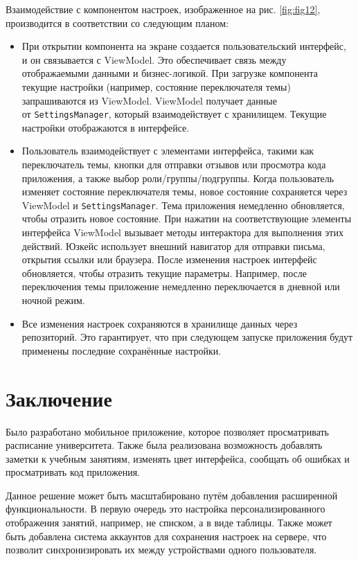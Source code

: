 \documentclass{vsureport}
\begin{document}
Взаимодействие с компонентом настроек, изображенное на рис. \ref{fig:fig12}, производится в соответствии со следующим планом:
\begin{itemize}
    \item При открытии компонента на экране создается пользовательский интерфейс, и он связывается с ViewModel. Это обеспечивает связь между отображаемыми данными и бизнес-логикой. При загрузке компонента текущие настройки (например, состояние переключателя темы) запрашиваются из ViewModel. ViewModel получает данные \\ от \texttt{SettingsManager}, который взаимодействует с хранилищем. Текущие настройки отображаются в интерфейсе.
    \item Пользователь взаимодействует с элементами интерфейса, такими как переключатель темы, кнопки для отправки отзывов или просмотра кода приложения, а также выбор роли/группы/подгруппы. Когда пользователь изменяет состояние переключателя темы, новое состояние сохраняется через ViewModel и \texttt{SettingsManager}. Тема приложения немедленно обновляется, чтобы отразить новое состояние. При нажатии на соответствующие элементы интерфейса ViewModel вызывает методы интерактора для выполнения этих действий. Юзкейс использует внешний навигатор для отправки письма, открытия ссылки или браузера. После изменения настроек интерфейс обновляется, чтобы отразить текущие параметры. Например, после переключения темы приложение немедленно переключается в дневной или ночной режим.
    \item Все изменения настроек сохраняются в хранилище данных через репозиторий. Это гарантирует, что при следующем запуске приложения будут применены последние сохранённые настройки.
\end{itemize}

\newpage
\section*{Заключение}

Было разработано мобильное приложение, которое позволяет просматривать расписание университета. Также была реализована возможность добавлять заметки к учебным занятиям, изменять цвет интерфейса, сообщать об ошибках и просматривать код приложения.

Данное решение может быть масштабировано путём добавления расширенной функциональности. В первую очередь это настройка персонализированного отображения занятий, например, не списком, а в виде таблицы. Также может быть добавлена система аккаунтов для сохранения настроек на сервере, что позволит синхронизировать их между устройствами одного пользователя.
\end{document}
